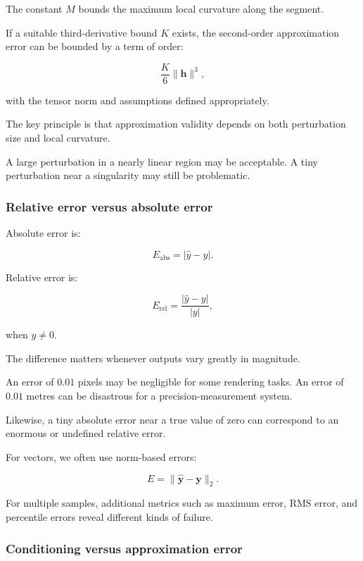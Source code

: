 The constant \(M\) bounds the maximum local curvature along the segment.

If a suitable third-derivative bound \(K\) exists, the second-order approximation error can be bounded by a term of order:

\[
\frac K6\|\mathbf h\|^3,
\]

with the tensor norm and assumptions defined appropriately.

The key principle is that approximation validity depends on both perturbation size and local curvature.

A large perturbation in a nearly linear region may be acceptable. A tiny perturbation near a singularity may still be problematic.

\subsubsection{Relative error versus absolute error}\label{02-foundations-ii-ch021-relative-error-versus-absolute-error}

\hypertarget{02-foundations-ii-ch021-relative-error-versus-absolute-error}{}

Absolute error is:

\[
E_{\text{abs}}=|\hat y-y|.
\]

Relative error is:

\[
E_{\text{rel}}=\frac{|\hat y-y|}{|y|},
\]

when \(y\ne0\).

The difference matters whenever outputs vary greatly in magnitude.

An error of \(0.01\) pixels may be negligible for some rendering tasks. An error of \(0.01\) metres can be disastrous for a precision-measurement system.

Likewise, a tiny absolute error near a true value of zero can correspond to an enormous or undefined relative error.

For vectors, we often use norm-based errors:

\[
E=\|\hat{\mathbf y}-\mathbf y\|_2.
\]

For multiple samples, additional metrics such as maximum error, RMS error, and percentile errors reveal different kinds of failure.

\subsubsection{Conditioning versus approximation error}\label{02-foundations-ii-ch021-conditioning-versus-approximation-error}

